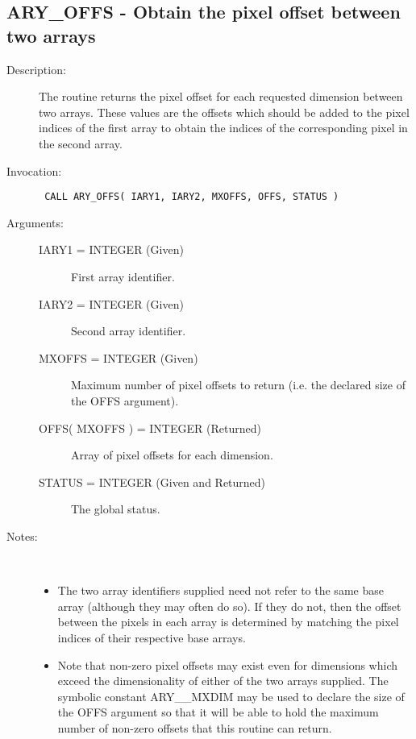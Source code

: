 \documentclass[twoside,11pt]{article}
\newcommand{\xlabel}[1]{}
\newlength{\sstbannerlength}
\newlength{\sstcaptionlength}
\newlength{\sstexampleslength}
\newlength{\sstexampleswidth}
\newcommand{\sstroutine}[3]{
   \goodbreak
   \rule{\textwidth}{0.5mm}
   \vspace{-7ex}
   \newline
   \settowidth{\sstbannerlength}{{\Large {\bf #1}}}
   \setlength{\sstcaptionlength}{\textwidth}
   \setlength{\sstexampleslength}{\textwidth}
   \addtolength{\sstbannerlength}{0.5em}
   \addtolength{\sstcaptionlength}{-2.0\sstbannerlength}
   \addtolength{\sstcaptionlength}{-5.0pt}
   \settowidth{\sstexampleswidth}{{\bf Examples:}}
   \addtolength{\sstexampleslength}{-\sstexampleswidth}
   \parbox[t]{\sstbannerlength}{\flushleft{\Large {\bf #1}}}
   \parbox[t]{\sstcaptionlength}{\center{\Large #2}}
   \parbox[t]{\sstbannerlength}{\flushright{\Large {\bf #1}}}
   \begin{description}
      #3
   \end{description}
}
\newcommand{\sstdescription}[1]{\item[Description:] #1}
\newcommand{\sstinvocation}[1]{\item[Invocation:]\hspace{0.4em}{\tt #1}}
\newcommand{\sstarguments}[1]{
   \item[Arguments:] \mbox{} \\
   \vspace{-3.5ex}
   \begin{description}
      #1
   \end{description}
}
\newcommand{\sstsubsection}[1]{ \item[{#1}] \mbox{} \\}
\newcommand{\sstnotes}[1]{\item[Notes:] \mbox{} \\[1.3ex] #1}
\newcommand{\sstitemlist}[1]{
  \mbox{} \\
  \vspace{-3.5ex}
  \begin{itemize}
     #1
  \end{itemize}
}
\newcommand{\sstitem}{\item}
\newcommand{\ssttt}{\tt}
\renewcommand{\sstroutine}[3]{
      \subsection{#1\xlabel{#1}-\label{#1}#2}
      \begin{description}
         #3
      \end{description}
   }
\renewcommand{\sstdescription}[1]{\item[Description:]
      \begin{description}
         #1
      \end{description}
   }
\renewcommand{\sstinvocation}[1]{\item[Invocation:]
      \begin{description}
         {\ssttt #1}
      \end{description}
   }
\renewcommand{\sstarguments}[1]{
      \item[Arguments:]
      \begin{description}
         #1
      \end{description}
   }
\renewcommand{\sstsubsection}[1]{\item[{#1}]}
\renewcommand{\sstnotes}[1]{\item[Notes:]
      \begin{description}
         #1
      \end{description}
   }
\newcommand{\sstitemlist}[1]{
      \begin{itemize}
         #1
      \end{itemize}
   }
\begin{document}
\sstroutine{
   ARY\_OFFS
}{
   Obtain the pixel offset between two arrays
}{
   \sstdescription{
      The routine returns the pixel offset for each requested dimension
      between two arrays. These values are the offsets which should be
      added to the pixel indices of the first array to obtain the
      indices of the corresponding pixel in the second array.
   }
   \sstinvocation{
      CALL ARY\_OFFS( IARY1, IARY2, MXOFFS, OFFS, STATUS )
   }
   \sstarguments{
      \sstsubsection{
         IARY1 = INTEGER (Given)
      }{
         First array identifier.
      }
      \sstsubsection{
         IARY2 = INTEGER (Given)
      }{
         Second array identifier.
      }
      \sstsubsection{
         MXOFFS = INTEGER (Given)
      }{
         Maximum number of pixel offsets to return (i.e. the declared
         size of the OFFS argument).
      }
      \sstsubsection{
         OFFS( MXOFFS ) = INTEGER (Returned)
      }{
         Array of pixel offsets for each dimension.
      }
      \sstsubsection{
         STATUS = INTEGER (Given and Returned)
      }{
         The global status.
      }
   }
   \sstnotes{
      \sstitemlist{

         \sstitem
         The two array identifiers supplied need not refer to the same
         base array (although they may often do so). If they do not, then
         the offset between the pixels in each array is determined by
         matching the pixel indices of their respective base arrays.

         \sstitem
         Note that non-zero pixel offsets may exist even for dimensions
         which exceed the dimensionality of either of the two arrays
         supplied. The symbolic constant ARY\_\_MXDIM may be used to declare
         the size of the OFFS argument so that it will be able to hold the
         maximum number of non-zero offsets that this routine can return.
      }
   }
}
\end{document}
